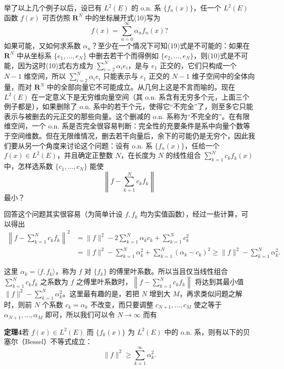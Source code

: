 举了以上几个例子以后，设已有 $L^2(E)$ 的 o.n. 系 $\{f_n(x)\}$，任一个 $L^2(E)$ 函数 $f(x)$ 可否仿照 $\mathbf R^N$ 中的坐标展开式(10)写为
\begin{equation}
 f(x)=\sum_{n=0}^{\infty}\alpha_nf_n(x)?
 \tag{19}
\end{equation}
如果可能，又如何求系数 $\alpha_n$？至少在一个情况下可知(19)式是不可能的：如果在 $\mathbf R^N$ 中从坐标系 $\{e_1,\ldots,e_N\}$ 中删去若干个而得例如 $\{e_2,\ldots,e_N\}$，则(10)式是不可能，因为这时(10)式右方成为 $\sum_{i=2}^N\alpha_i e_i$，是与 $e_1$ 正交的，它们只构成一个 $N-1$ 维空间，所以 $\sum_{i=2}^N\alpha_i e_i$ 只能表示与 $e_1$ 正交的 $N-1$ 维子空间中的全体向量，而对 $\mathbf R^N$ 中的全部向量它不可能成立。从几何上这是不言而喻的。现在 $L^2(E)$ 在一定意义下是无穷维向量空间（其 o.n. 系含有无穷多个元，上面三个例子都是），如果删除了 o.n. 系中的若干个元，使得它“不完全”了，则至多它只能表示与被删去的元正交的那些向量。这个删减的 o.n. 系称为“不完全的”。在有限维空间，一个 o.n. 系是否完全很容易判断：完全性的充要条件是系中向量个数等于空间维数。但在无限维情况，删去若干向量后，余下的可能仍是无穷个，因此我们要从另一个角度来讨论这个问题：设有 o.n. 系 $\{f_n(x)\}$，任给一个 $f(x)\in L^2(E)$，并且确定正整数 $N$，在长度为 $N$ 的线性组合 $\sum_{k=1}^Nc_kf_k(x)$ 中，怎样选系数 $\{c_1,\ldots,c_N\}$ 能使
\[
 \left\|f-\sum_{k=1}^Nc_kf_k\right\|
\]
最小？

回答这个问题其实很容易（为简单计设 $f,f_k$ 均为实值函数），经过一些计算，可以得出
\begin{equation}
\begin{aligned}
 \left\|f-\sum_{k=1}^Nc_kf_k\right\|^2
 &=\|f\|^2-2\sum_{k=1}^N\alpha_kc_k+\sum_{k=1}^Nc_k^2\\
 &=\|f\|^2-\sum_{k=1}^N\alpha_k^2+\sum_{k=1}^N(\alpha_k-c_k)^2
 \ge \|f\|^2-\sum_{k=1}^N\alpha_k^2.
\end{aligned}
 \tag{20}
\end{equation}
\begin{sloppypar}
这里 $\alpha_k=\langle f,f_k\rangle$，称为 $f$ 对 $\{f_k\}$ 的傅里叶系数。所以当且仅当线性组合 $\sum_{k=1}^Nc_kf_k$ 之系数为 $f$ 之傅里叶系数时，$\left\|f-\sum_{k=1}^Nc_kf_k\right\|$ 将达到其最小值 $\|f\|^2-\sum_{k=1}^N\alpha_k^2$。这里最有趣的是，若把 $N$ 增到大 $M$，再求类似问题之解时，则前 $N$ 个系数 $c_k=\alpha_k$ 不改变，而只要调整 $c_{N+1},\ldots,c_M$ 使之等于 $\alpha_{N+1},\ldots,\alpha_M$ 即可，所以我们可以令 $N\to\infty$ 而有
\end{sloppypar}

\noindent\textbf{定理4}\quad 若 $f(x)\in L^2(E)$ 而 $\{f_k(x)\}$ 为 $L^2(E)$ 中的 o.n. 系，则有以下的贝塞尔（Bessel）不等式成立：
\begin{equation}
 \|f\|^2\ge\sum_{k=1}^{\infty}\alpha_k^2.
 \tag{21}
\end{equation}

